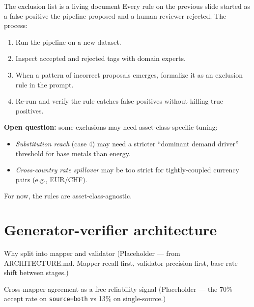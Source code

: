 \documentclass[10pt,aspectratio=169]{beamer}
\begin{document}
\begin{frame}{The exclusion list is a living document}
  \footnotesize
  Every rule on the previous slide started as a false positive the pipeline
  proposed and a human reviewer rejected. The process:

  \begin{enumerate}
    \item Run the pipeline on a new dataset.
    \item Inspect accepted and rejected tags with domain experts.
    \item When a pattern of incorrect proposals emerges, formalize it as an
          exclusion rule in the prompt.
    \item Re-run and verify the rule catches false positives without
          killing true positives.
  \end{enumerate}

  \medskip
  \textbf{Open question:} some exclusions may need asset-class-specific tuning:
  \begin{itemize}
    \item \textit{Substitution reach} (case 4) may need a stricter
          ``dominant demand driver'' threshold for base metals than energy.
    \item \textit{Cross-country rate spillover} may be too strict for
          tightly-coupled currency pairs (e.g., EUR/CHF).
  \end{itemize}

  \medskip
  For now, the rules are asset-class-agnostic.
\end{frame}

\section{Generator-verifier architecture}

\begin{frame}{Why split into mapper and validator}
  \small
  (Placeholder --- from ARCHITECTURE.md. Mapper recall-first, validator
  precision-first, base-rate shift between stages.)
\end{frame}

\begin{frame}{Cross-mapper agreement as a free reliability signal}
  \small
  (Placeholder --- the 70\% accept rate on \texttt{source=both} vs 13\% on
  single-source.)
\end{frame}
\end{document}

